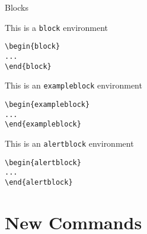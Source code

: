 \documentclass[presentation]{beamer}\mode<presentation>{\usetheme{AMSBolognaFC}}
\begin{document}
\begin{frame}[c,fragile]{Blocks}
%
\begin{block}{This is a \texttt{block} environment}
\begin{verbatim}
\begin{block}
...
\end{block}
\end{verbatim}
\end{block}
%
\begin{exampleblock}{This is an \texttt{exampleblock} environment}
\begin{verbatim}
\begin{exampleblock}
...
\end{exampleblock}
\end{verbatim}
\end{exampleblock}
%
\begin{alertblock}{This is an \texttt{alertblock} environment}
\begin{verbatim}
\begin{alertblock}
...
\end{alertblock}
\end{verbatim}
\end{alertblock}
%
\end{frame}

\section{New Commands}
\end{document}
